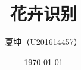 \documentclass[supercite]{HustGraduPaper}
\title{花卉识别} %
\author{夏坤（U201614457）} %
\date{\today} %
\begin{document}
\begin{sloppypar}
	
	\maketitle
	
	
	\clearpage %

    \clearpage
    \phantom{s}
    \thispagestyle{empty}
    \clearpage
	

\end{sloppypar}
\end{document}

